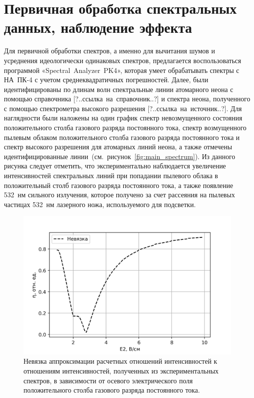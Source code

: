\section{Первичная обработка спектральных данных, наблюдение эффекта}

Для первичной обработки спектров, а именно для вычитания шумов и усреднения идеологически одинаковых спектров,
предлагается воспользоваться программой «Spectral~Analyzer~PK4», которая умеет обрабатывать спектры с НА~ПК-4 с учетом
среднеквадратичных погрешностей. Далее, были идентифицированы по длинам волн спектральные линии атомарного неона с помощью справочника
[?..ссылка~на~справочник..?] и спектра неона, полученного с помощью спектрометра высокого разрешения [?..ссылка~на~источник..?].
Для наглядности были наложены на один график
спектр невозмущенного состояния положительного столба газового разряда постоянного тока,
спектр возмущенного пылевым облаком положительного столба газового разряда постоянного тока и
спектр высокого разрешения для атомарных линий неона, а также отмечены идентифицированные линии~(см.~рисунок~\ref{fig:main_spectrum}).
Из данного рисунка следует отметить, что экспериментально наблюдается увеличение интенсивностей спектральных
линий при попадании пылевого облака в положительный столб газового разряда постоянного тока,
а также появление 532~нм сильного излучения, которое получено за счет рассеяния на пылевых частицах
532~нм лазерного ножа, используемого для подсветки.
\begin{figure}[t]
  \centering
  \includegraphics[width=16cm]{figures/discrepancy}
  \caption{Невязка аппроксимации расчетных отношений интенсивностей к отношениям интенсивностей, полученных из
  экспериментальных спектров, в зависимости от осевого электрического поля положительного столба газового разряда постоянного тока.}
  \label{fig:discrepancy}
\end{figure}

